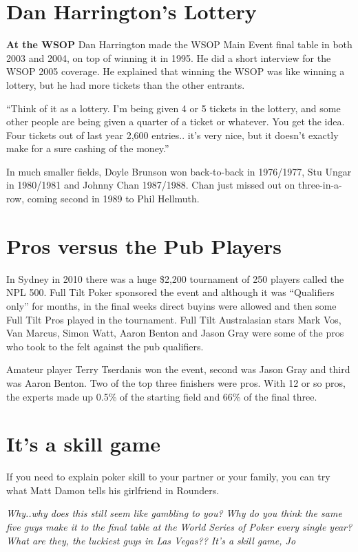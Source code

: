 \section{Dan Harrington's Lottery}

\textbf{At the WSOP} Dan Harrington made the WSOP Main Event final
table in both 2003 and 2004, on top of winning it in 1995. He
did a short interview for the WSOP 2005 coverage. He explained that
winning the WSOP was like winning a lottery, but he had more tickets
than the other entrants.

``Think of it as a lottery. I'm being given 4 or 5 tickets in the
lottery, and some other people are being given a quarter of a ticket
or whatever. You get the idea. Four tickets out of last year 2,600
entries.. it's very nice, but it doesn't exactly make for a sure
cashing of the money.''

In much smaller fields, Doyle Brunson won back-to-back in 1976/1977,
Stu Ungar in 1980/1981 and Johnny Chan 1987/1988. Chan just missed out
on three-in-a-row, coming second in 1989 to Phil Hellmuth.

\section{Pros versus the Pub Players}

In Sydney in 2010 there was a huge \$2,200 tournament of 250 players
called the NPL 500. Full Tilt Poker sponsored the event and although
it was ``Qualifiers only'' for months, in the final weeks direct
buyins were allowed and then some Full Tilt Pros played in the
tournament.  Full Tilt Australasian stars Mark Vos, Van Marcus, Simon
Watt, Aaron Benton and Jason Gray were some of the pros who took to
the felt against the pub qualifiers.

Amateur player Terry Tserdanis won the event, second was Jason Gray and
third was Aaron Benton. Two of the top three finishers were pros. With
12 or so pros, the experts made up 0.5\% of the starting field and
66\% of the final three.

\section{It's a skill game}

If you need to explain poker skill to your partner or your family, you
can try what Matt Damon tells his girlfriend in Rounders.

\textit{Why..why does this still seem like gambling to you? Why do you
  think the same five guys make it to the final table at the World
  Series of Poker every single year? What are they, the luckiest guys
  in Las Vegas?? It's a skill game, Jo}
